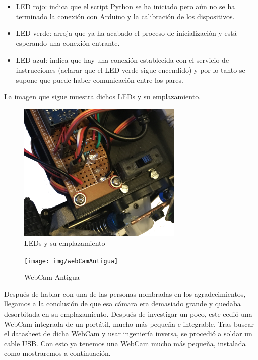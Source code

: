 \documentclass{pclass}
\begin{document}
\begin{itemize}
\begin{itemize}
	\item LED rojo: indica que el script Python se ha iniciado pero aún no se ha terminado la conexión con Arduino y la calibración de los dispositivos.
	\item LED verde: arroja que ya ha acabado el proceso de inicialización y está esperando una conexión entrante.
	\item LED azul: indica que hay una conexión establecida con el servicio de instrucciones (aclarar que el LED verde sigue encendido) y por lo tanto se supone que puede haber comunicación entre los pares.
	
\end{itemize}

La imagen que sigue muestra dichos LEDs y su emplazamiento.

\begin{figure}[H]
	\centering
	\includegraphics[width=0.7\textwidth]{img/leds}
	\caption{LEDs y su emplazamiento}
	\label{fig:leds}
\end{figure}



\begin{figure}[H]
	\centering
	\texttt{[image: img/webCamAntigua]}
	\caption{WebCam Antigua}
	\label{fig:webcamvieja}
\end{figure}

Después de hablar con una de las personas nombradas en los agradecimientos, llegamos a la conclusión de que esa cámara era demasiado grande y quedaba desorbitada en su emplazamiento. Después de investigar un poco, este cedió una WebCam integrada de un portátil, mucho más pequeña e integrable. Tras buscar el datasheet de dicha WebCam y usar ingeniería inversa, se procedió a soldar un cable USB. Con esto ya tenemos una WebCam mucho más pequeña, instalada como mostraremos a continuación.


\end{itemize}
\end{document}
